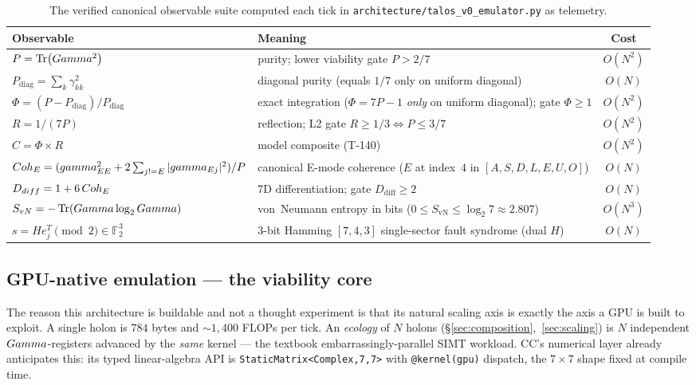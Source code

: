 \begin{table}[H]
\centering\small
\caption{The verified canonical observable suite computed each tick in
\texttt{architecture/talos\_v0\_emulator.py} as \TALOS{} telemetry.}
\label{tab:observables}
\begin{tabular}{@{}p{3.9cm}p{5.8cm}c@{}}
\toprule
\textbf{Observable} & \textbf{Meaning} & \textbf{Cost} \\
\midrule
$P=\Tr(Gamma^2)$ & purity; lower viability gate $P>2/7$ & $O(N^2)$ \\
$P_{\mathrm{diag}}=\sum_k \gamma_{kk}^2$ & diagonal purity (equals $1/7$ only on uniform diagonal) & $O(N)$ \\
$\Phi=(P-P_{\mathrm{diag}})/P_{\mathrm{diag}}$ & exact integration ($\Phi=7P-1$ \emph{only} on uniform diagonal); gate $\Phi\ge 1$ & $O(N^2)$ \\
$R=1/(7P)$ & reflection; L2 gate $R\ge 1/3\Leftrightarrow P\le 3/7$ & $O(N^2)$ \\
$C=\Phi\times R$ & model composite (T-140) & $O(N^2)$ \\
$Coh_E=(gamma_{EE}^2+2\sum_{j!= E}|gamma_{Ej}|^2)/P$ & canonical E-mode coherence ($E$ at index~$4$ in $[A,S,D,L,E,U,O]$) & $O(N)$ \\
$D_{diff}=1+6\,Coh_E$ & 7D differentiation; gate $D_{\mathrm{diff}}\ge 2$ & $O(N)$ \\
$S_{vN}=-\Tr(Gamma\log_2Gamma)$ & von~Neumann entropy in bits ($0\le S_{\mathrm{vN}}\le\log_2 7\approx 2.807$) & $O(N^3)$ \\
$s = He_j^T\pmod 2\in\mathbb{F}_2^3$ & $3$-bit Hamming $[7,4,3]$ single-sector fault syndrome (dual $H$) & $O(N)$ \\
\bottomrule
\end{tabular}
\end{table}

\subsection{GPU-native emulation --- the viability core}
\label{subsec:gpu}

The reason this architecture is buildable and not a thought experiment is that
its natural scaling axis is exactly the axis a GPU is built to exploit. A single
holon is $784$ bytes and ${\sim}1{,}400$ FLOPs per tick. An \emph{ecology} of $N$
holons (\S\ref{sec:composition},~\ref{sec:scaling}) is $N$ independent
$Gamma$-registers advanced by the \emph{same} kernel --- the textbook
embarrassingly-parallel SIMT workload. CC's numerical layer already anticipates
this: its typed linear-algebra API is
\texttt{StaticMatrix<Complex,7,7>} with \texttt{@kernel(gpu)} dispatch, the
$7\times7$ shape fixed at compile time.

